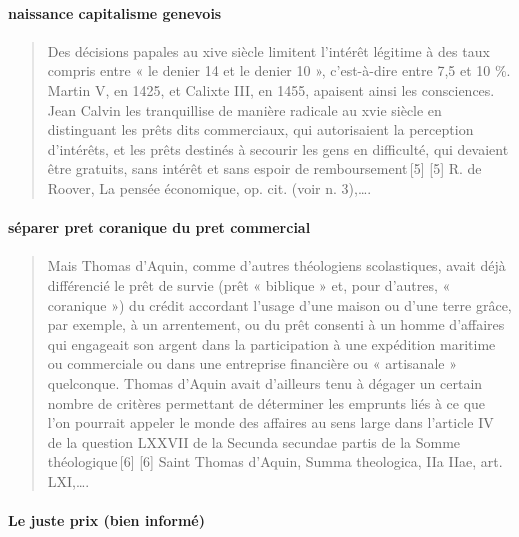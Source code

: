  \paragraph{naissance capitalisme genevois}
 \begin{quote}
     Des décisions papales au xive siècle limitent l’intérêt légitime à des taux compris entre « le denier 14 et le denier 10 », c’est-à-dire entre 7,5 et 10 \%. Martin V, en 1425, et Calixte III, en 1455, apaisent ainsi les consciences. Jean Calvin les tranquillise de manière radicale au xvie siècle en distinguant les prêts dits commerciaux, qui autorisaient la perception d’intérêts, et les prêts destinés à secourir les gens en difficulté, qui devaient être gratuits, sans intérêt et sans espoir de remboursement [5]
[5]
R. de Roover, La pensée économique, op. cit. (voir n. 3),…. 
 \end{quote}
 
 
 \paragraph{séparer pret coranique du pret commercial}
 \begin{quote}
     Mais Thomas d’Aquin, comme d’autres théologiens scolastiques, avait déjà différencié le prêt de survie (prêt « biblique » et, pour d’autres, « coranique ») du crédit accordant l’usage d’une maison ou d’une terre grâce, par exemple, à un arrentement, ou du prêt consenti à un homme d’affaires qui engageait son argent dans la participation à une expédition maritime ou commerciale ou dans une entreprise financière ou « artisanale » quelconque. Thomas d’Aquin avait d’ailleurs tenu à dégager un certain nombre de critères permettant de déterminer les emprunts liés à ce que l’on pourrait appeler le monde des affaires au sens large dans l’article IV de la question LXXVII de la Secunda secundae partis de la Somme théologique [6]
[6]
Saint Thomas d’Aquin, Summa theologica, IIa IIae, art. LXI,….
 \end{quote}
 
 \paragraph{Le juste prix (bien informé)}
 

